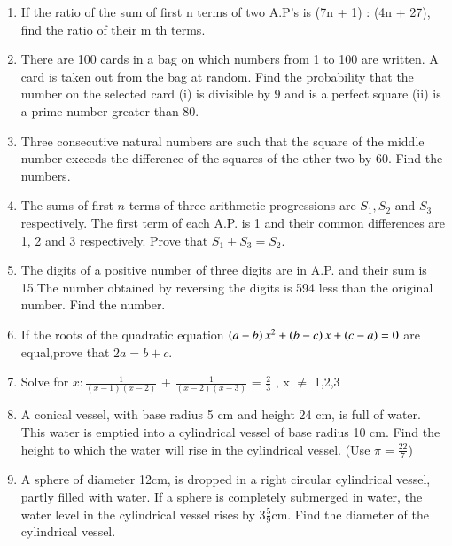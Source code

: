 \documentclass[book,11pt]{IEEEtran}
\renewcommand\thesection{\arabic{section}}
\begin{document}
\begin{enumerate}[label=\thesection.\arabic*.,ref=\thesection.\theenumi]
\item  If the ratio of the sum of first n terms of two A.P's is (7n + 1) : (4n + 27), find the ratio of their m th terms.\\
\item There are 100 cards in a bag on which numbers from 1 to 100 are written. A card is taken out from the bag at random. Find the probability that the number on the selected card (i) is divisible by 9 and is a perfect square
(ii) is a prime number greater than 80.\\
\item Three consecutive natural numbers are such that the square of the middle number exceeds the difference of the squares of the other two by 60. Find the numbers.\\
\item The sums of first $n$ terms of three arithmetic progressions are $S_1, S_2$ and $S_3$ respectively. The first term of each A.P. is 1 and their common differences are 1, 2 and 3 respectively. Prove that $S_1+S_3=S_2$.\\
\item The digits of a positive number of three digits are in A.P. and their sum is 15.The number obtained by reversing the digits is 594 less than the original number. Find the number.\\
\item If the roots of the quadratic equation $\left(a-b\right)x^2+\left(b-c\right)x+\left(c-a\right)=0$ are equal,prove that $2a=b+c$.\\
\item  Solve for $ x :  \frac{1}{(x-1)(x-2)} $ + $ \frac{1}{(x-2)(x-3)} $ = $ \frac{2}{3}$ , x $\neq$ 1,2,3   \\     
\item  A conical vessel, with base radius 5 cm and height 24 cm, is full of water. This water is emptied into a cylindrical vessel of base radius 10 cm. Find the height to which the water will rise in the cylindrical vessel. (Use $ \pi  = \frac{22}{7}$)\\

\item  A sphere of diameter 12cm, is dropped in a right circular cylindrical vessel, partly filled with water. If a sphere is completely submerged in water, the water level in the cylindrical vessel rises by $ 3 \frac{5}{9}$cm. Find the diameter of the cylindrical vessel.\\  


\end{enumerate}
\end{document}

